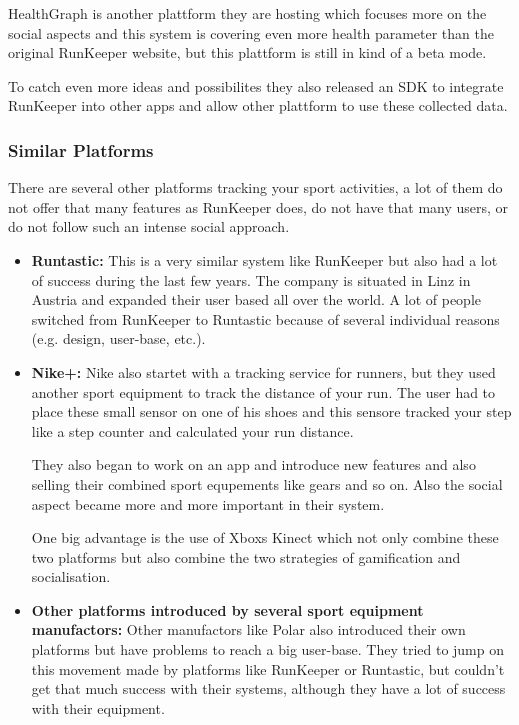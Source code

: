 \documentclass[a4paper,11pt]{article}
\begin{document}
HealthGraph is another plattform they are hosting which focuses more on the social aspects and this system is covering even more health parameter than the original RunKeeper website, but this plattform is still in kind of a beta mode.

To catch even more ideas and possibilites they also released an SDK to integrate RunKeeper into other apps and allow other plattform to use these collected data. \\

\subsubsection{Similar Platforms}
\label{sect:star:competitors}
There are several other platforms tracking your sport activities, a lot of them do not offer that many features as RunKeeper does, do not have that many users, or do not follow such an intense social approach.

\begin{itemize}
	\item \textbf{Runtastic:} This is a very similar system like RunKeeper but also had a lot of success during the last few years. The company is situated in Linz in Austria and expanded their user based all over the world. A lot of people switched from RunKeeper to Runtastic because of several individual reasons (e.g. design, user-base, etc.). \\
	\item \textbf{Nike+:} Nike also startet with a tracking service for runners, but they used another sport equipment to track the distance of your run. The user had to place these small sensor on one of his shoes and this sensore tracked your step like a step counter and calculated your run distance.
	
	They also began to work on an app and introduce new features and also selling their combined sport equpements like gears and so on. Also the social aspect became more and more important in their system.
	
	One big advantage is the use of Xboxs Kinect which not only combine these two platforms but also combine the two strategies of gamification and socialisation. \\
	\item \textbf{Other platforms introduced by several sport equipment manufactors:} Other manufactors like Polar also introduced their own platforms but have problems to reach a big user-base. They tried to jump on this movement made by platforms like RunKeeper or Runtastic, but couldn't get that much success with their systems, although they have a lot of success with their equipment.
\end{itemize}
\end{document}
